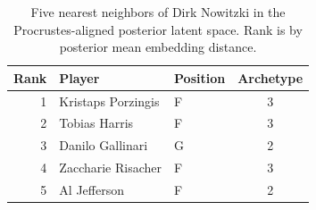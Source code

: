 \begin{table}[htbp]
  \centering\small
  \begin{tabular}{rllc}
    \toprule
    Rank & Player & Position & Archetype \\
    \midrule
    1 & Kristaps Porzingis & F & 3 \\
    2 & Tobias Harris & F & 3 \\
    3 & Danilo Gallinari & G & 2 \\
    4 & Zaccharie Risacher & F & 3 \\
    5 & Al Jefferson & F & 2 \\
    \bottomrule
  \end{tabular}
  \caption{Five nearest neighbors of Dirk Nowitzki in the Procrustes-aligned posterior latent space. Rank is by posterior mean embedding distance.}
  \label{tab:Dirk_Nowitzki_neighbors}
\end{table}

